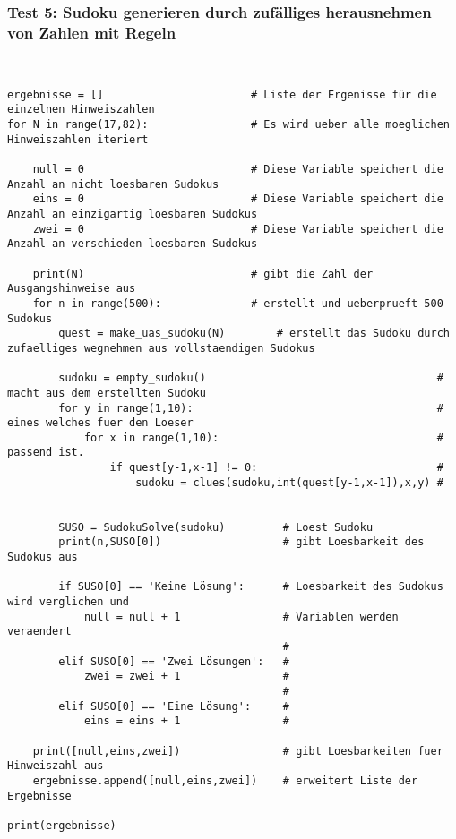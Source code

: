 \documentclass[11pt,a4paper]{article}
\begin{document}
\subsubsection{Test 5: Sudoku generieren durch zufälliges herausnehmen von Zahlen mit Regeln}
\ \\
\begin{verbatim}
ergebnisse = []                       # Liste der Ergenisse für die einzelnen Hinweiszahlen 
for N in range(17,82):                # Es wird ueber alle moeglichen Hinweiszahlen iteriert 

    null = 0                          # Diese Variable speichert die Anzahl an nicht loesbaren Sudokus
    eins = 0                          # Diese Variable speichert die Anzahl an einzigartig loesbaren Sudokus
    zwei = 0                          # Diese Variable speichert die Anzahl an verschieden loesbaren Sudokus
    
    print(N)                          # gibt die Zahl der Ausgangshinweise aus
    for n in range(500):              # erstellt und ueberprueft 500 Sudokus
        quest = make_uas_sudoku(N)        # erstellt das Sudoku durch zufaelliges wegnehmen aus vollstaendigen Sudokus
        
        sudoku = empty_sudoku()                                    # macht aus dem erstellten Sudoku
        for y in range(1,10):                                      # eines welches fuer den Loeser 
            for x in range(1,10):                                  # passend ist.
                if quest[y-1,x-1] != 0:                            # 
                    sudoku = clues(sudoku,int(quest[y-1,x-1]),x,y) # 
        

        SUSO = SudokuSolve(sudoku)         # Loest Sudoku
        print(n,SUSO[0])                   # gibt Loesbarkeit des Sudokus aus
        
        if SUSO[0] == 'Keine Lösung':      # Loesbarkeit des Sudokus wird verglichen und  
            null = null + 1                # Variablen werden veraendert
                                           #
        elif SUSO[0] == 'Zwei Lösungen':   #
            zwei = zwei + 1                #
                                           #
        elif SUSO[0] == 'Eine Lösung':     #
            eins = eins + 1                #
    
    print([null,eins,zwei])                # gibt Loesbarkeiten fuer Hinweiszahl aus
    ergebnisse.append([null,eins,zwei])    # erweitert Liste der Ergebnisse

print(ergebnisse)
\end{verbatim}
\ \\
\end{document}
